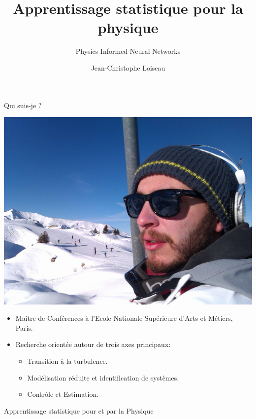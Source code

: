\documentclass[aspectratio=169,compress,12pt,dvipsnames]{beamer}
\title{Apprentissage statistique pour la physique}
\subtitle{Physics Informed Neural Networks}
\date{}
\author{Jean-Christophe Loiseau}
\institute{Arts \& Métiers}
\begin{document}
\frame[plain]{\titlepage}


\begin{frame}[plain]{Qui suis-je ?}
  \vfill
  \begin{minipage}{.28\textwidth}
    \centering
    \includegraphics[width=\textwidth]{myself.jpg}
  \end{minipage}%
  \hfill
  \begin{minipage}{.68\textwidth}
    \begin{itemize}
      \item Maître de Conférences à l'Ecole Nationale Supérieure d'Arts et Métiers, Paris.
        \par
      \item Recherche orientée autour de trois axes principaux:
        \begin{itemize}
          \item Transition à la turbulence.
          \item Modélisation réduite et identification de systèmes.
          \item Contrôle et Estimation.
        \end{itemize}
    \end{itemize}
  \end{minipage}
  \vfill
\end{frame}

\begin{frame}
  \vfill
  \centering
  {Apprentissage statistique pour et par la Physique}
  \vfill
\end{frame}
\end{document}
